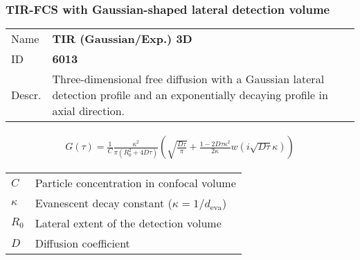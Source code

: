 \subsubsection{TIR-FCS with Gaussian-shaped lateral detection volume}


\noindent \begin{tabular}{lp{}}
Name & \textbf{TIR (Gaussian/Exp.) 3D} \\ 
ID & \textbf{6013} \\ 
Descr. &  Three-dimensional free diffusion with a Gaussian lateral detection profile and an exponentially decaying profile in axial direction\cite{Starr2001, Hassler2005, Ohsugi2006}. \\ 
\end{tabular}
\begin{align}
G(\tau) = \frac{1}{C}  \frac{ \kappa^2}{ \pi (R_0^2 +4D\tau)}
 \left( \sqrt{\frac{D \tau}{\pi}} + \frac{1 - 2 D \tau \kappa^2}{2 \kappa}  w\!\left(i \sqrt{D \tau} \kappa\right) \right)
\end{align} 
\begin{center}
\begin{tabular}{ll}
$C$ & Particle concentration in confocal volume \\ 
$\kappa$ &  Evanescent decay constant ($\kappa = 1/d_\mathrm{eva}$)\\ 
$R_0$ & Lateral extent of the detection volume \\
$D$ & Diffusion coefficient  \\
\end{tabular}
\end{center}
\vspace{2em}


